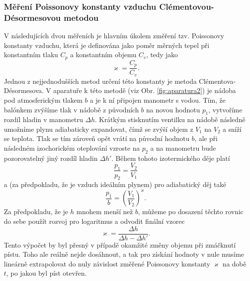 \documentclass[english]{article}
\begin{document}
			\subsubsection{Měření Poissonovy konstanty vzduchu Clémentovou-Désormesovou metodou}
					V následujících dvou měřeních je hlavním úkolem změření tzv. Poissonovy konstanty vzduchu, která je definována jako poměr měrných tepel při konstantním tlaku $C_p$ a konstantním objemu $C_v$, tedy jako
					\begin{equation}
						\varkappa = \frac{C_p}{C_v}.
					\end{equation}
					Jednou z nejjednodušších metod určení této konstanty je metoda Clémentova-Désormesova. V aparatuře k této metodě (viz Obr. \ref{fig:aparatura2}) je nádoba pod atmosferickým tlakem $b$ a je k ní připojen manometr s vodou. Tím, že balónkem zvýšíme tlak v nádobě z původních $b$ na novou hodnotu $p_1$, vytvoříme rozdíl hladin v manometru $\Delta h$. Krátkým stisknutím ventilku na nádobě následně umožníme plynu adiabaticky expandovat, čímž se zvýší objem z $V_1$ na $V_2$ a sníží se teplota. Tlak se tím zároveň opět vrátí na původní hodnotu $b$, ale při následném izochorickém oteplování vzroste na $p_2$ a na manometru bude pozorovatelný jiný rozdíl hladin $\Delta h'$. Během tohoto izotermického děje platí 
					\begin{equation}\label{eq:izoterma}
						\frac{p_1}{p_2} = \frac{V_2}{V_1}
					\end{equation}		
					a (za předpokladu, že je vzduch ideálním plynem) pro adiabatický děj také
					\begin{equation}
						\frac{p_1}{b} = \left( \frac{V_1}{V_2}\right)^\varkappa.
					\end{equation}
					Za předpokladu, že je $h$ mnohem menší než $b$, můžeme po dosazení těchto rovnic do sebe použít rozvoj pro logaritmus a odvodit finální vzorec
					\begin{equation}\label{eq:psst}
						\varkappa = \frac{\Delta h}{\Delta h-\Delta h'} .
					\end{equation}
					Tento výpočet by byl přesný v případě okamžité změny objemu při zmáčknutí pístu. Toho ale reálně nejde dosáhnout, a tak pro získání hodnoty v nule musíme lineárně extrapolovat do nuly závislost změřené Poissonovy konstanty $\varkappa$ na době $t$, po jakou byl píst otevřen. 
							
\end{document}

